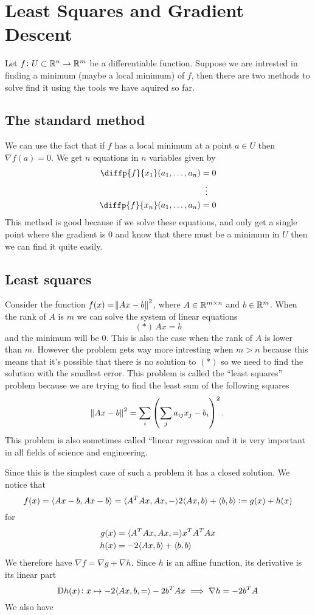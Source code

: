 \documentclass[11pt,a4paper]{article}
\begin{document}
\newpage

\section{Least Squares and Gradient Descent}
Let $f \colon U \subset \mathbb{R}^n \to \mathbb{R}^m$ be a differentiable function.
Suppose we are intrested in finding a minimum (maybe a local minimum) of $f$,
then there are two methods to solve find it using the tools we have aquired
so far.

\subsection{The standard method}
We can use the fact that if $f$ has a local minimum at a point $a \in U$ then
$\nabla f(a) = 0$.
We get $n$ equations in $n$ variables given by
\begin{align*}
  \diffp{f}{{x_1}}(a_1,\dots,a_n) &= 0 \\
                                  &\vdotswithin{=} \\
  \diffp{f}{{x_n}}(a_1,\dots,a_n) &= 0
\end{align*}
This method is good because if we solve these equations, and only get a single
point where the gradient is $0$ and know that there must be a minimum in $U$
then we can find it quite easily.

\subsection{Least squares}
Consider the function $f(x) = \norm{Ax - b}^2$, where $A \in \mathbb{R}^{m \times n}$
and $b \in \mathbb{R}^m$.
When the rank of $A$ is $m$ we can solve the system of linear equations
\[
  (*)\,Ax = b
\]
and the minimum will be $0$.
This is also the case when the rank of $A$ is lower than $m$.
However the problem gets way more intresting when $m > n$ because this means
that it's possible that there is no solution to $(*)$ so we need to find
the solution with the smallest error.
This problem is called the ``least squares'' problem because we are trying
to find the least sum of the following squares
\[
  \norm{Ax - b}^2 = \sum_{i}\del{\sum_{j} a_{ij} x_{j} - b_{i}}^2.
\]
This problem is also sometimes called ``linear regression and it is very
important in all fields of science and engineering.

Since this is the simplest case of such a problem it has a closed solution.
We notice that
\[
  f(x) = \langle Ax - b, Ax - b \rangle =
  \langle A^T Ax, Ax, - \rangle 2 \langle Ax, b \rangle + \langle b, b \rangle :=
  g(x) + h(x)
\]
for
\begin{align*}
  g(x) &= \langle A^T Ax, Ax, = \rangle x^T A^T A x \\
  h(x) &= - 2 \langle Ax, b \rangle + \langle b, b \rangle
\end{align*}
We therefore have $\nabla f = \nabla g + \nabla h$.
Since $h$ is an affine function, its derivative is its linear part
\[
  \Dif h(x) \colon x \mapsto - 2 \ip{Ax, b} = - 2 b^T A x \implies
  \nabla h = - 2 b^T A
\]
We also have
\end{document}
